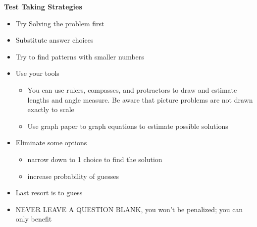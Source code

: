 \documentclass[11pt,letterpaper]{article}
\begin{document}
\centering
\begin{minipage}{\textwidth}
     \noindent \textbf{Test Taking Strategies}
     \begin{itemize}
          \item Try Solving the problem first
          \item Substitute answer choices
          \item Try to find patterns with smaller numbers
          \item Use your tools
           \begin{itemize}
               \item You can use rulers, compasses, and protractors to draw and estimate lengths and angle measure. Be aware that picture problems are not drawn exactly to scale
               \item Use graph paper to graph equations to estimate possible solutions
          \end{itemize}
          \item Eliminate some options 
          \begin{itemize}
               \item narrow down to 1 choice to find the solution
               \item increase probability of guesses
          \end{itemize}
          \item Last resort is to guess
          \item NEVER LEAVE A QUESTION BLANK, you won't be penalized; you can only benefit
          
     \end{itemize}

\end{minipage}


\vspace{0.4cm}
\end{document}
